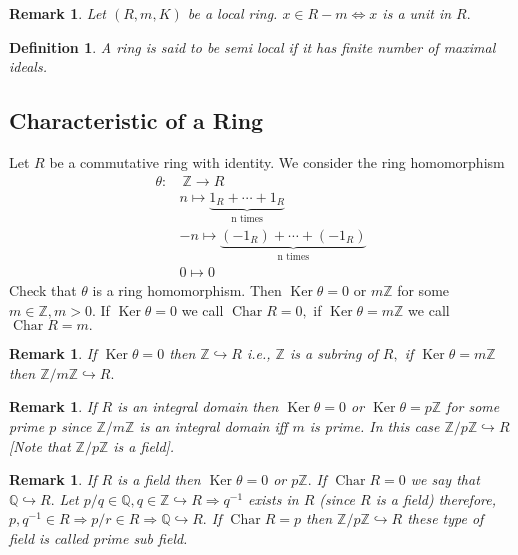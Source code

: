 \documentclass[11pt]{amsart}
\newtheorem{defn}[theorem]{Definition}
\newtheorem{remark}[theorem]{Remark}%
\newcommand{\QQ}{\mathbb Q}
\newcommand{\ZZ}{\mathbb Z}
\begin{document}
\begin{remark}
Let $(R,m,K)$ be a local ring. $x\in R-m \Leftrightarrow x$ is a unit in $R.$
\end{remark}

\begin{defn}
A ring is said to be semi local if it has finite number of maximal ideals.
\end{defn}

\subsection{Characteristic of a Ring}

Let $R$ be a commutative ring with identity. We consider the ring homomorphism \begin{align*}
\theta:&~{\ZZ}\to R\\
&n\mapsto\displaystyle\underbrace{1_R+\cdots +1_R}_{\text{n times}}\\
&-n\mapsto\displaystyle\underbrace{(-1_R)+\cdots +(-1_R)}_{\text{n times}}\\
&0\mapsto 0
\end{align*}
Check that $\theta$ is a ring homomorphism. Then $\operatorname{Ker}\theta=0$ or $m{\ZZ}$ for some $m\in {\ZZ},m>0.$ If $\operatorname{Ker}\theta=0$ we call $\operatorname{Char}R=0,$ if $\operatorname{Ker}\theta=m{\ZZ}$ we call $\operatorname{Char}R=m.$

\begin{remark}
If $\operatorname{Ker}\theta=0$ then ${\ZZ}\hookrightarrow R$ i.e., ${\ZZ}$ is a subring of $R,$ if $\operatorname{Ker}\theta=m{\ZZ}$ then ${\ZZ}/m{\ZZ}\hookrightarrow R.$
\end{remark}

\begin{remark}
If $R$ is an integral domain then $\operatorname{Ker}\theta=0$ or $\operatorname{Ker}\theta=p{\ZZ}$ for some prime $p$ since ${\ZZ}/m{\ZZ}$ is an integral domain iff $m$ is prime. In this case ${\ZZ}/p{\ZZ}\hookrightarrow R$ [Note that ${\ZZ}/p{\ZZ}$ is a field].
\end{remark}

\begin{remark}
If $R$ is a field then $\operatorname{Ker}\theta=0$ or $p{\ZZ}.$ If $\operatorname{Char}R=0$ we say that ${\QQ}\hookrightarrow R.$ Let $p/q\in {\QQ}, q\in {\ZZ}\hookrightarrow R \Rightarrow q^{-1}$ exists in $R$ (since $R$ is a field) therefore, $p,q^{-1}\in R\Rightarrow p/r\in R \Rightarrow {\QQ}\hookrightarrow R.$ If $\operatorname{Char}R=p$ then ${\ZZ}/p{\ZZ} \hookrightarrow R$ these type of field is called prime sub field.
\end{remark}
\end{document}
